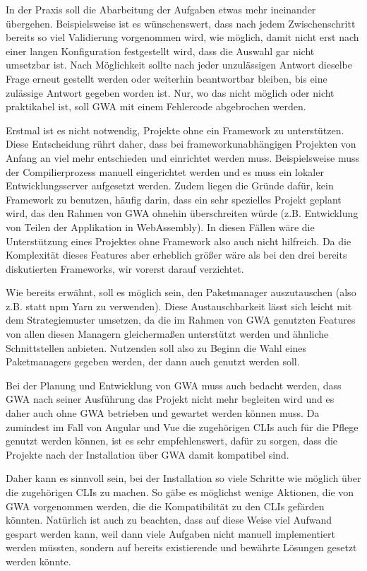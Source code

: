 In der Praxis soll die Abarbeitung der Aufgaben etwas mehr ineinander übergehen. Beispielsweise ist es wünschenswert, dass nach jedem Zwischenschritt bereits so viel Validierung vorgenommen wird, wie möglich, damit nicht erst nach einer langen Konfiguration festgestellt wird, dass die Auswahl gar nicht umsetzbar ist. Nach Möglichkeit sollte nach jeder unzulässigen Antwort dieselbe Frage erneut gestellt werden oder weiterhin beantwortbar bleiben, bis eine zulässige Antwort gegeben worden ist. Nur, wo das nicht möglich oder nicht praktikabel ist, soll \gls{GWA} mit einem Fehlercode abgebrochen werden.

Erstmal ist es nicht notwendig, Projekte ohne ein Framework zu unterstützen. Diese Entscheidung rührt daher, dass bei frameworkunabhängigen Projekten von Anfang an viel mehr entschieden und einrichtet werden muss. Beispielsweise muss der Compilierprozess manuell eingerichtet werden und es muss ein lokaler Entwicklungsserver aufgesetzt werden. Zudem liegen die Gründe dafür, kein Framework zu benutzen, häufig darin, dass ein sehr spezielles Projekt geplant wird, das den Rahmen von \gls{GWA} ohnehin überschreiten würde (z.B. Entwicklung von Teilen der Applikation in WebAssembly). In diesen Fällen wäre die Unterstützung eines Projektes ohne Framework also auch nicht hilfreich. Da die Komplexität  dieses Features aber erheblich größer wäre als bei den drei bereits diskutierten Frameworks, wir vorerst darauf verzichtet.

Wie bereits erwähnt, soll es möglich sein, den Paketmanager auszutauschen (also z.B. statt \gls{npm} Yarn zu verwenden). Diese Austauschbarkeit lässt sich leicht mit dem Strategiemuster umsetzen, da die im Rahmen von \gls{GWA} genutzten Features von allen diesen Managern gleichermaßen unterstützt werden und ähnliche Schnittstellen anbieten. Nutzenden soll also zu Beginn die Wahl eines Paketmanagers gegeben werden, der dann auch genutzt werden soll.

Bei der Planung und Entwicklung von \gls{GWA} muss auch bedacht werden, dass \gls{GWA} nach seiner Ausführung das Projekt nicht mehr begleiten wird und es daher auch ohne \gls{GWA} betrieben und gewartet werden können muss. Da zumindest im Fall von Angular und Vue die zugehörigen \gls{CLI}s auch für die Pflege genutzt werden können, ist es sehr empfehlenswert, dafür zu sorgen, dass die Projekte nach der Installation über \gls{GWA} damit kompatibel sind.

\label{decision_use_clis}
Daher kann es sinnvoll sein, bei der Installation so viele Schritte wie möglich über die zugehörigen \gls{CLI}s zu machen. So gäbe es möglichst wenige Aktionen, die von \gls{GWA} vorgenommen werden, die die Kompatibilität zu den \gls{CLI}s gefärden könnten. Natürlich ist auch zu beachten, dass auf diese Weise viel Aufwand gespart werden kann, weil dann viele Aufgaben nicht manuell implementiert werden müssten, sondern auf bereits existierende und bewährte Lösungen gesetzt werden könnte.

